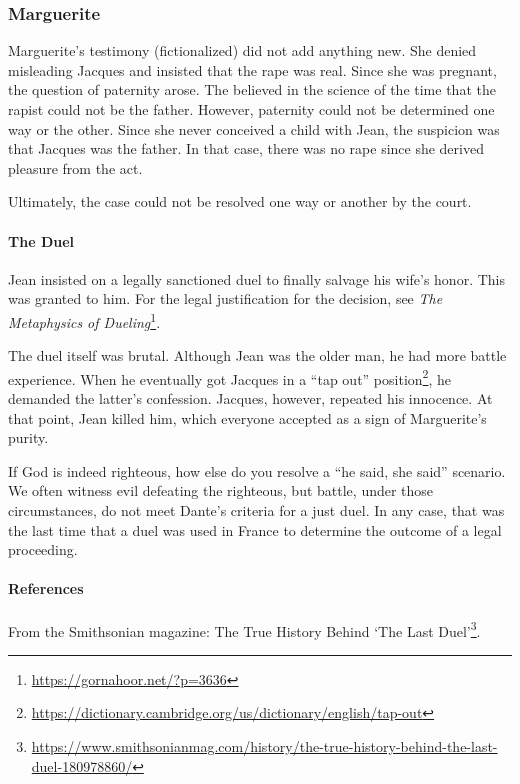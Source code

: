 \subsubsection{Marguerite}


Marguerite's testimony (fictionalized) did not add anything new. She denied misleading Jacques and insisted that the rape was real. Since she was pregnant, the question of paternity arose. The believed in the science of the time that the rapist could not be the father. However, paternity could not be determined one way or the other. Since she never conceived a child with Jean, the suspicion was that Jacques was the father. In that case, there was no rape since she derived pleasure from the act.

Ultimately, the case could not be resolved one way or another by the court.

\paragraph{The Duel}


Jean insisted on a legally sanctioned duel to finally salvage his wife's honor. This was granted to him. For the legal justification for the decision, see \textit{The Metaphysics of Dueling}\footnote{\url{https://gornahoor.net/?p=3636}}.

The duel itself was brutal. Although Jean was the older man, he had more battle experience. When he eventually got Jacques in a ``tap out'' position\footnote{\url{https://dictionary.cambridge.org/us/dictionary/english/tap-out}}, he demanded the latter's confession. Jacques, however, repeated his innocence. At that point, Jean killed him, which everyone accepted as a sign of Marguerite's purity.

If God is indeed righteous, how else do you resolve a ``he said, she said'' scenario. We often witness evil defeating the righteous, but battle, under those circumstances, do not meet Dante's criteria for a just duel. In any case, that was the last time that a duel was used in France to determine the outcome of a legal proceeding.

\paragraph{References}


From the Smithsonian magazine: The True History Behind `The Last Duel'\footnote{\url{https://www.smithsonianmag.com/history/the-true-history-behind-the-last-duel-180978860/}}.

